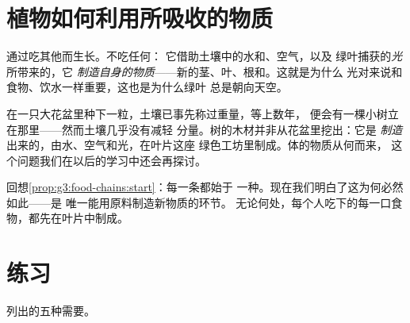 \section{植物如何利用所吸收的物质}

\begin{proposition}[植物自行制造物质]\label{prop:g4:what-plants-need:make}
通过吃其他而生长。不吃任何：
它借助土壤中的水和、空气，以及
绿叶捕获的\emph{光}所带来的，它
\emph{制造自身的物质}——新的茎、叶、根和。这就是为什么
光对来说和食物、饮水一样重要，这也是为什么绿叶
总是朝向天空。
\end{proposition}
\admitted

\begin{example}[几乎凭空长出的一棵树]\label{ex:g4:what-plants-need:tree}
在一只大花盆里种下一粒，土壤已事先称过重量，等上数年，
便会有一棵小树立在那里——然而土壤几乎没有减轻
分量。树的木材并非从花盆里挖出：它是
\emph{制造}出来的，由水、空气和光，在叶片这座
绿色工坊里制成。体的物质从何而来，
这个问题我们在以后的学习中还会再探讨。
\end{example}

\begin{remark}[绿色供养每一个人]\label{rem:g4:what-plants-need:everyone}
回想\cref{prop:g3:food-chains:start}：每一条都始于
一种。现在我们明白了这为何必然如此——是
唯一能用原料制造新物质的环节。
无论何处，每个人吃下的每一口食物，都先在叶片中制成。
\end{remark}

\section{练习}

\begin{exercise}[$\star$]\label{exo:g4:what-plants-need:1}
列出的五种需要。
\end{exercise}

